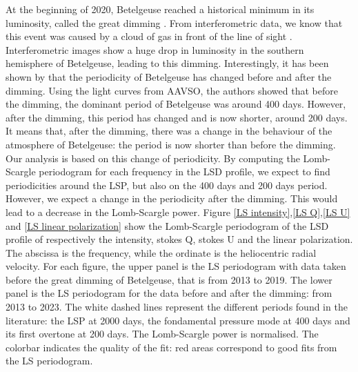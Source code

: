 \documentclass{aa}
\begin{document}
At the beginning of 2020, Betelgeuse reached a historical minimum in its luminosity, called the great dimming \citep{guinan_fall_2020}. 
From interferometric data, we know that this event was caused by a cloud of gas in front of the line of sight \citep{montarges_dusty_2021}. 
Interferometric images show a huge drop in luminosity in the southern hemisphere of Betelgeuse, leading to this dimming. Interestingly, 
it has been shown by \cite{jadlovsky_analysis_2023} that the periodicity of Betelgeuse has changed before and after the dimming. Using the light curves from AAVSO, 
the authors showed that before the dimming, the dominant period of Betelgeuse was around 400 days. However, after the dimming, this period has changed and 
is now shorter, around 200 days. It means that, after the dimming, there was a change in the behaviour of the atmosphere of Betelgeuse: the period is now
shorter than before the dimming. Our analysis is based on this change of periodicity. By computing the Lomb-Scargle periodogram for each frequency 
in the LSD profile, we expect to find periodicities around the LSP, but also on the 400 days and 200 days period. However, we expect a change
in the periodicity after the dimming. This would lead to a decrease in the Lomb-Scargle power. 
Figure \ref{LS intensity},\ref{LS Q},\ref{LS U} and \ref{LS linear polarization} show the Lomb-Scargle periodogram of the LSD profile of respectively 
the intensity, stokes Q, stokes U and the linear polarization. The abscissa is the frequency, while the ordinate is the heliocentric radial velocity. 
For each figure, the upper panel is the LS periodogram with data taken before the great dimming of Betelgeuse, that is from 2013 to 2019. 
The lower panel is the LS periodogram for the data before and after the dimming: from 2013 to 2023. The white dashed lines represent the different 
periods found in the literature: the LSP at 2000 days, the fondamental pressure mode at 400 days and its first overtone at 200 days. The Lomb-Scargle 
power is normalised. The colorbar indicates the quality of the fit: red areas correspond to good fits from the LS periodogram.
\end{document}
